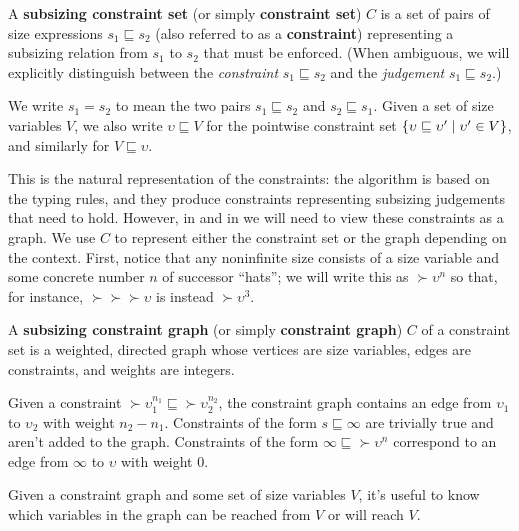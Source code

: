 \begin{definition}
A \textbf{subsizing constraint set} (or simply \textbf{constraint set}) $C$ is a set of pairs of size expressions $s_1 \sqsubseteq s_2$ (also referred to as a \textbf{constraint})
representing a subsizing relation from $s_1$ to $s_2$ that must be enforced.
(When ambiguous, we will explicitly distinguish between the \emph{constraint} $s_1 \sqsubseteq s_2$ and the \emph{judgement} $s_1 \sqsubseteq s_2$.)

We write $s_1 = s_2$ to mean the two pairs $s_1 \sqsubseteq s_2$ and $s_2 \sqsubseteq s_1$.
Given a set of size variables $V$, we also write $\upsilon \sqsubseteq V$ for the pointwise constraint set $\{\upsilon \sqsubseteq \upsilon' \mid \upsilon' \in V\}$,
and similarly for $V \sqsubseteq \upsilon$.
\end{definition}

This is the natural representation of the constraints:
the algorithm is based on the typing rules,
and they produce constraints representing subsizing judgements that need to hold.
However, in \RecCheck and in \solve we will need to view these constraints as a graph.
We use $C$ to represent either the constraint set or the graph depending on the context.
First, notice that any noninfinite size consists of a size variable and some concrete number $n$ of successor ``hats'';
we will write this as $\succ{\upsilon}^n$ so that, for instance, $\succ{\succ{\succ{\upsilon}}}$ is instead $\succ{\upsilon}^3$.

\begin{definition}
A \textbf{subsizing constraint graph} (or simply \textbf{constraint graph}) $C$ of a constraint set is a weighted, directed graph whose vertices are size variables, edges are constraints, and weights are integers.

Given a constraint \mbox{$\succ{\upsilon}_1^{n_1} \sqsubseteq \succ{\upsilon}_2^{n_2}$},
the constraint graph contains an edge from $\upsilon_1$ to $\upsilon_2$ with weight $n_2 - n_1$.
Constraints of the form $s \sqsubseteq \infty$ are trivially true and aren't added to the graph.
Constraints of the form $\infty \sqsubseteq \succ{\upsilon}^n$ correspond to an edge from $\infty$ to $\upsilon$ with weight $0$.
\end{definition}

Given a constraint graph and some set of size variables $V$,
it's useful to know which variables in the graph can be reached from $V$ or will reach $V$.

